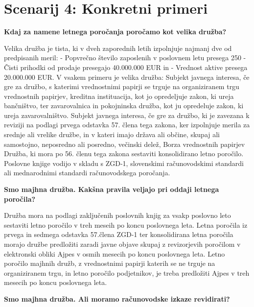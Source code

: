 \documentclass[a4paper,12pt,openright]{book}
\begin{document}
\section*{Scenarij 4: Konkretni primeri}

\textbf{Kdaj za namene letnega poročanja poročamo kot velika družba?}

Velika družba je tista, ki v dveh zaporednih letih izpolnjuje najmanj dve od predpisanih meril:
- Popvrečno število zaposlenih v poslovnem letu presega 250
- Čisti prihodki od prodaje presegajo 40.000.000 EUR in
- Vrednost aktive presega 20.000.000 EUR.
V vsakem primeru je velika družba:
Subjekt javnega interesa, če gre za družbo, s katerimi vrednostnimi papirji se trguje na organiziranem trgu vrednostnih papirjev, kreditna instituacija, kot jo opredeljuje zakon, ki ureja bančništvo, ter zavarovalnica in pokojninska družba, kot ju opredeluje zakon, ki ureja zavarovalništvo.
Subjekt javnega interesa, če gre za družbo, ki je zavezana k reviziji na podlagi prvega odstavka 57. člena tega zakona, ker izpolnjuje merila za srednje ali vrelike družbe, in v kateri imajo država ali občine, skupaj ali samostojno, neposredno ali posredno, večinski delež,
Borza vrednostnih papirjev
Družba, ki mora po 56. členu tega zakona sestaviti konsolidirano letno poročilo.
Poslovne knjige vodijo v skladu s ZGD-1, slovenskimi računovodskimi standardi ali mednarodnimi standardi računovodskega poročanja.

\textbf{Smo majhna družba. Kakšna pravila veljajo pri oddaji letnega poročila?}

Družba mora na podlagi zaključenih poslovnih knjig za vsakp poslovno leto sestaviti letno poročilo v treh meseih po koncu poslovnega leta. Letna poročila iz prvega in sedmega odstavka 57.člena ZGD-1 ter konsolidirana letna poročila morajo družbe predložiti  zaradi javne objave skupaj z revizorjevih poročilom v elektronski obliki Ajpes v osmih mesecih po koncu poslovnega leta. Letno poročilo majhnih družb, z vrednostnimi papirji katerih se ne trguje na organiziranem trgu, in letno poročilo podjetnikov, je treba predložiti Ajpes v treh mesecih po koncu poslovnega leta.

\textbf{Smo majhna družba. Ali moramo računovodske izkaze revidirati?}
\end{document}
